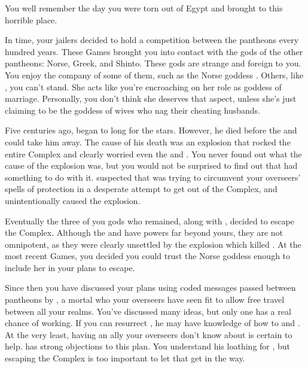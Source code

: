 \documentclass[char]{guardians}
\begin{document}
You well remember the day you were torn out of Egypt and brought to this horrible place.

In time, your jailers decided to hold a competition between the pantheons every hundred years. These Games brought you into contact with the gods of the other pantheons: Norse, Greek, and Shinto. These gods are strange and foreign to you. You enjoy the company of some of them, such as the Norse goddess \cHel{}. Others, like \cHera{}, you can't stand. She acts like you're encroaching on her role as goddess of marriage. Personally, you don't think she deserves that aspect, unless she's just claiming to be the goddess of wives who nag their cheating husbands.


Five centuries ago, \cSet{} began to long for the stars. However, he died before the \cWarden{} and \cCaretaker{} could take him away. The cause of his death was an explosion that rocked the entire Complex and clearly worried even the \cWarden{} and \cCaretaker{}. You never found out what the cause of the explosion was, but you would not be surprised to find out that \cOsiris{} had something to do with it. \cAnubis{} suspected that \cSet{} was trying to circumvent your overseers' spells of protection in a desperate attempt to get out of the Complex, and unintentionally caused the explosion.

Eventually the three of you gods who remained, along with \cEgyptianHuman{}, decided to escape the Complex. Although the \cWarden{} and \cCaretaker{} have powers far beyond yours, they are not omnipotent, as they were clearly unsettled by the explosion which killed \cSet{}. At the most recent Games, you decided you could trust the Norse goddess \cHel{} enough to include her in your plans to escape.

Since then you have discussed your plans using coded messages passed between pantheons by \cJascha{}, a mortal who your overseers have seen fit to allow free travel between all your realms. You've discussed many ideas, but only one has a real chance of working. If you can resurrect \cSet{}, he may have knowledge of how to  \cWarden{} and \cCaretaker{}. At the very least, having an ally your overseers don't know about is certain to help. \cOsiris{} has strong objections to this plan. You understand his loathing for \cSet{}, but escaping the Complex is too important to let that get in the way.
\end{document}
